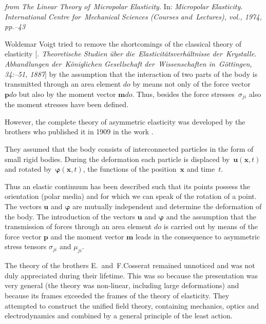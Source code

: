 \begin{tcolorbox}[breakable, enhanced, colback = orange!8, before upper={\parindent3.2ex}, parbox = false]
\small%
\setlength{\abovedisplayskip}{2pt}\setlength{\belowdisplayskip}{2pt}%

\noindent \textit{from  The Linear Theory of~Micropolar Elasticity.} In: \textit{Micropolar Elasticity. International Centre for~Mechanical Sciences (Courses and~Lectures), vol., 1974, pp.\hbox{--}43}

\vspace{.5em}

Woldemar Voigt tried to remove the shortcomings of the classical theory of elasticity [\textit{. Theoretische Studien über die~Elasticitätsverhältnisse der~Krystalle. Abhandlungen der~Königlichen Gesellschaft der~Wissenschaften in~Göttingen, 34:\hbox{--}51, 1887}] by the assumption that the interaction of two parts of the body is transmitted through an area element $do$ by means not only of the force vector $\bm{p}do$ but also by the moment vector $\bm{m}do$. Thus, besides the force stresses~$\sigma_{ji}$ also the moment stresses have been defined.

However, the complete theory of asymmetric elasticity was developed by the brothers  who published it in 1909 in the work \textit{}.

They assumed that the body consists of interconnected particles in the form of small rigid bodies. During the deformation each particle is displaced by~$\bm{u}(\bm{x},t)$ and rotated by~$\bm{\varphi}(\bm{x},t)$, the functions of the position~$\bm{x}$ and time~$t$.

Thus an elastic continuum has been described such that its points possess the orientation (polar media) and for which we can speak of the rotation of a point. The vectors $\bm{u}$ and $\bm{\varphi}$ are mutually independent and determine the deformation of the body. The introduction of the vectors $\bm{u}$ and $\bm{\varphi}$ and the assumption that the transmission of forces through an area element $do$ is carried out by means of the force vector $\bm{p}$ and the moment vector $\bm{m}$ leads in the consequence to asymmetric stress tensors $\sigma_{ji}$ and $\mu_{ji}$.

The theory of the brothers E.~and~F.\;Cosserat remained unnoticed and was not duly appreciated during their lifetime. This was so because the presentation was very general (the theory was non-linear, including large deformations) and because its frames exceeded the frames of the theory of elasticity. They attempted to construct the unified field theory, containing mechanics, optics and electrodynamics and combined by a general principle of the least action.


\end{tcolorbox}
